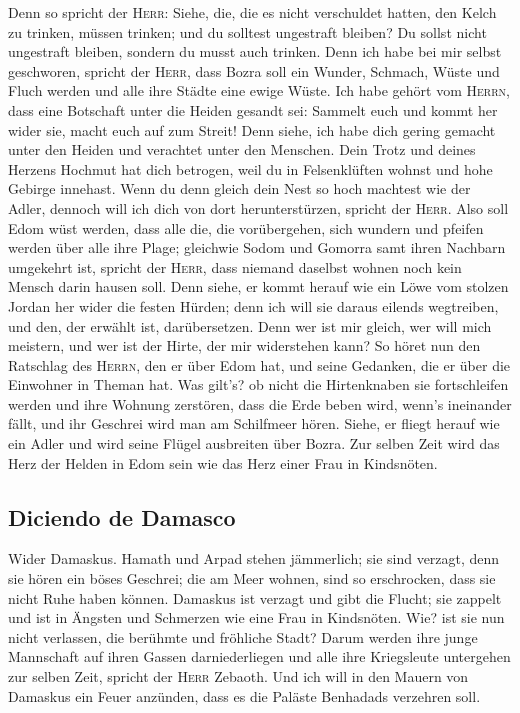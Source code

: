  Denn so spricht der \textsc{Herr}: Siehe, die, die es
nicht verschuldet hatten, den Kelch zu trinken, müssen trinken; und du
solltest ungestraft bleiben? Du sollst nicht ungestraft bleiben, sondern
du musst auch trinken.  Denn ich habe bei mir selbst
geschworen, spricht der \textsc{Herr}, dass Bozra soll ein Wunder,
Schmach, Wüste und Fluch werden und alle ihre Städte eine ewige Wüste.
 Ich habe gehört vom \textsc{Herrn}, dass eine Botschaft
unter die Heiden gesandt sei: Sammelt euch und kommt her wider sie,
macht euch auf zum Streit!  Denn siehe, ich habe dich
gering gemacht unter den Heiden und verachtet unter den Menschen.
 Dein Trotz und deines Herzens Hochmut hat dich betrogen,
weil du in Felsenklüften wohnst und hohe Gebirge innehast. Wenn du denn
gleich dein Nest so hoch machtest wie der Adler, dennoch will ich dich
von dort herunterstürzen, spricht der \textsc{Herr}. 
Also soll Edom wüst werden, dass alle die, die vorübergehen, sich
wundern und pfeifen werden über alle ihre Plage; 
gleichwie Sodom und Gomorra samt ihren Nachbarn umgekehrt ist, spricht
der \textsc{Herr}, dass niemand daselbst wohnen noch kein Mensch darin
hausen soll.  Denn siehe, er kommt herauf wie ein Löwe
vom stolzen Jordan her wider die festen Hürden; denn ich will sie daraus
eilends wegtreiben, und den, der erwählt ist, darübersetzen. Denn wer
ist mir gleich, wer will mich meistern, und wer ist der Hirte, der mir
widerstehen kann?  So höret nun den Ratschlag des
\textsc{Herrn}, den er über Edom hat, und seine Gedanken, die er über
die Einwohner in Theman hat. Was gilt's? ob nicht die Hirtenknaben sie
fortschleifen werden und ihre Wohnung zerstören,  dass
die Erde beben wird, wenn's ineinander fällt, und ihr Geschrei wird man
am Schilfmeer hören.  Siehe, er fliegt herauf wie ein
Adler und wird seine Flügel ausbreiten über Bozra. Zur selben Zeit wird
das Herz der Helden in Edom sein wie das Herz einer Frau in Kindsnöten.

\hypertarget{diciendo-de-damasco}{%
\subsection{Diciendo de Damasco}\label{diciendo-de-damasco}}

 Wider Damaskus. Hamath und Arpad stehen jämmerlich; sie
sind verzagt, denn sie hören ein böses Geschrei; die am Meer wohnen,
sind so erschrocken, dass sie nicht Ruhe haben können. 
Damaskus ist verzagt und gibt die Flucht; sie zappelt und ist in Ängsten
und Schmerzen wie eine Frau in Kindsnöten.  Wie? ist sie
nun nicht verlassen, die berühmte und fröhliche Stadt? 
Darum werden ihre junge Mannschaft auf ihren Gassen darniederliegen und
alle ihre Kriegsleute untergehen zur selben Zeit, spricht der
\textsc{Herr} Zebaoth.  Und ich will in den Mauern von
Damaskus ein Feuer anzünden, dass es die Paläste Benhadads verzehren
soll.

